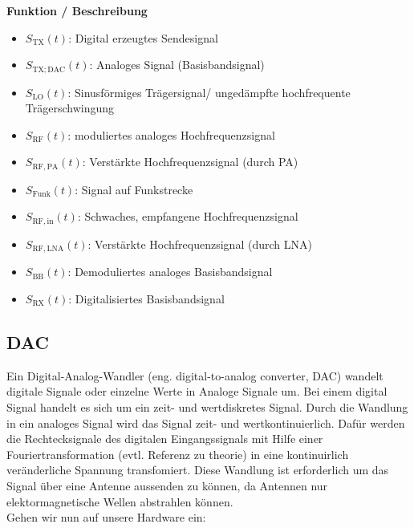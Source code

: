 \begin{minipage}{0.48\textwidth}
    \raggedright
    \textbf{\large Funktion / Beschreibung}\\[2ex]
    \begin{itemize}
        \item $S_{\mathrm{TX}}(t)$: Digital erzeugtes Sendesignal
        \item $S_{\mathrm{TX;DAC}}(t)$: Analoges Signal (Basisbandsignal)
        \item $S_{\mathrm{LO}}(t)$: Sinusförmiges Trägersignal/ ungedämpfte hochfrequente Trägerschwingung
        \item $S_{\mathrm{RF}}(t)$: moduliertes analoges Hochfrequenzsignal
        \item $S_{\mathrm{RF,PA}}(t)$: Verstärkte Hochfrequenzsignal (durch PA)
        \item $S_{\mathrm{Funk}}(t)$: Signal auf Funkstrecke
        \item $S_{\mathrm{RF,in}}(t)$: Schwaches, empfangene Hochfrequenzsignal
        \item $S_{\mathrm{RF,LNA}}(t)$: Verstärkte Hochfrequenzsignal (durch LNA)
        \item $S_{\mathrm{BB}}(t)$: Demoduliertes analoges Basisbandsignal
        \item $S_{\mathrm{RX}}(t)$: Digitalisiertes Basisbandsignal
    \end{itemize}
\end{minipage}



\subsection{DAC}
Ein Digital-Analog-Wandler (eng. digital-to-analog converter, DAC) wandelt digitale Signale oder einzelne Werte in Analoge
Signale um. Bei einem digital Signal handelt es sich um ein zeit- und wertdiskretes Signal. Durch die Wandlung
in ein analoges Signal wird das Signal zeit- und wertkontinuierlich.  Dafür werden die Rechtecksignale des digitalen Eingangssignals mit Hilfe einer Fouriertransformation (evtl. Referenz zu theorie)
in eine  kontinuirlich veränderliche Spannung transfomiert. Diese Wandlung ist erforderlich um das Signal über eine
Antenne aussenden zu können, da Antennen nur elektormagnetische Wellen abstrahlen können. \\
Gehen wir nun auf unsere Hardware ein:
\\

